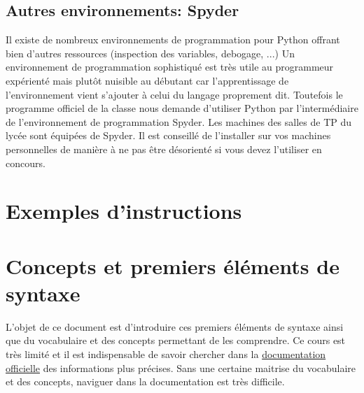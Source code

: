 \subsection{Autres environnements: Spyder}
Il existe de nombreux environnements de programmation pour Python offrant bien d'autres ressources (inspection des variables, debogage, ...) Un environnement de programmation sophistiqué est très utile au programmeur expérienté mais plutôt nuisible au débutant car l'apprentissage de l'environnement vient s'ajouter à celui du langage proprement dit.\newline
Toutefois le programme officiel de la classe nous demande d'utiliser Python par l'intermédiaire de l'environnement de programmation Spyder. Les machines des salles de TP du lycée sont équipées de Spyder. Il est conseillé de l'installer sur vos machines personnelles de manière à ne pas être désorienté si vous devez l'utiliser en concours. 



\section{Exemples d'instructions}



\section{Concepts et premiers éléments de syntaxe}
L'objet de ce document est d'introduire ces premiers éléments de syntaxe ainsi que du vocabulaire et des concepts permettant de les comprendre. Ce cours est très limité et il est indispensable de savoir chercher dans la \href{http://docs.python.org/3.3/reference/}{documentation officielle} des informations plus précises. Sans une certaine maitrise du vocabulaire et des concepts, naviguer dans la documentation est très difficile.
